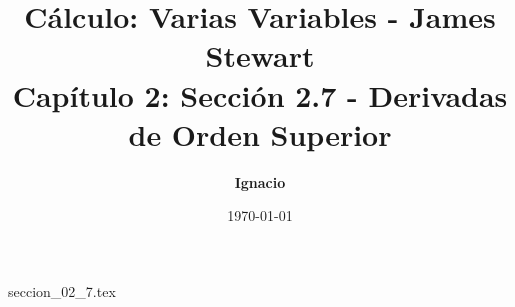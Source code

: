\documentclass[11pt,spanish,oneside]{report}
\title{\textbf{Cálculo: Varias Variables - James Stewart} \\ \Large Capítulo 2: Sección 2.7 - Derivadas de Orden Superior}
\author{\textbf{Ignacio}}
\date{\today}
\begin{document}
\maketitle

{seccion_02_7.tex}
\end{document}
